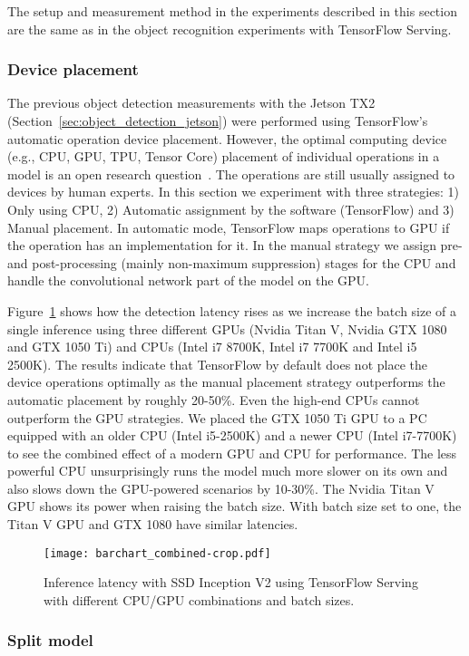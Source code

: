 \documentclass[sigconf]{acmart}
\begin{document}
The setup and measurement method in the experiments described in this section are the same as in the object recognition experiments with TensorFlow Serving.

\subsubsection{Device placement}

The previous object detection measurements with the Jetson TX2 (Section~\ref{sec:object_detection_jetson}) were performed using TensorFlow's automatic operation device placement. However, the optimal computing device (e.g., CPU, GPU, TPU, Tensor Core) placement of individual operations in a model is an open research question~\cite{mirhoseini17icml}. The operations are still usually assigned to devices by human experts. In this section we experiment with three strategies: 1) Only using CPU, 2) Automatic assignment by the software (TensorFlow) and 3) Manual placement. In automatic mode, TensorFlow maps operations to GPU if the operation has an implementation for it. In the manual strategy we assign pre- and post-processing (mainly non-maximum suppression) stages for the CPU and handle the convolutional network part of the model on the GPU.

Figure~\ref{fig:barchart_combined} shows how the detection latency rises as we increase the batch size of a single inference using three different GPUs (Nvidia Titan V, Nvidia GTX 1080 and GTX 1050 Ti) and CPUs (Intel i7 8700K, Intel i7 7700K and Intel i5 2500K). The results indicate that TensorFlow by default does not place the device operations optimally as the manual placement strategy outperforms the automatic placement by roughly 20-50\%. Even the high-end CPUs cannot outperform the GPU strategies. We placed the GTX 1050 Ti GPU to a PC equipped with an older CPU (Intel i5-2500K) and a newer CPU (Intel i7-7700K) to see the combined effect of a modern GPU and CPU for performance. The less powerful CPU unsurprisingly runs the model much more slower on its own and also slows down the GPU-powered scenarios by 10-30\%. The Nvidia Titan V GPU shows its power when raising the batch size. With batch size set to one, the Titan V GPU and GTX 1080 have similar latencies.

\begin{figure}[t]
\centering
\texttt{[image: barchart\_combined-crop.pdf]}
\caption{Inference latency with SSD Inception V2 using TensorFlow Serving with different CPU/GPU combinations and batch sizes.}
\label{fig:barchart_combined}
\end{figure}\subsubsection{Split model}
\end{document}

